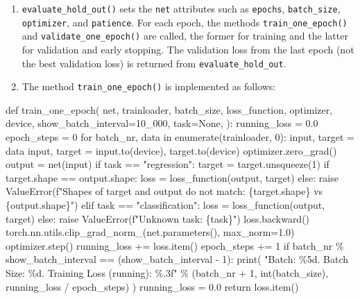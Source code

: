 \documentclass[
  letterpaper,
  DIV=11,
  numbers=noendperiod]{scrreprt}
\newenvironment{Shaded}{\begin{snugshade}}{\end{snugshade}}
\newcommand{\NormalTok}[1]{\textcolor[rgb]{0.00,0.23,0.31}{#1}}
\providecommand{\tightlist}{%
  \setlength{\itemsep}{0pt}\setlength{\parskip}{0pt}}\usepackage{longtable,booktabs,array}
\begin{document}
\begin{enumerate}
\def\labelenumi{\arabic{enumi}.}
\setcounter{enumi}{2}
\tightlist
\item
  \texttt{evaluate\_hold\_out()} sets the \texttt{net} attributes such
  as \texttt{epochs}, \texttt{batch\_size}, \texttt{optimizer}, and
  \texttt{patience}. For each epoch, the methods
  \texttt{train\_one\_epoch()} and \texttt{validate\_one\_epoch()} are
  called, the former for training and the latter for validation and
  early stopping. The validation loss from the last epoch (not the best
  validation loss) is returned from \texttt{evaluate\_hold\_out}.
\item
  The method \texttt{train\_one\_epoch()} is implemented as follows:
\end{enumerate}

\begin{Shaded}
\begin{Highlighting}[]
\NormalTok{def train\_one\_epoch(}
\NormalTok{    net,}
\NormalTok{    trainloader,}
\NormalTok{    batch\_size,}
\NormalTok{    loss\_function,}
\NormalTok{    optimizer,}
\NormalTok{    device,}
\NormalTok{    show\_batch\_interval=10\_000,}
\NormalTok{    task=None,}
\NormalTok{):}
\NormalTok{    running\_loss = 0.0}
\NormalTok{    epoch\_steps = 0}
\NormalTok{    for batch\_nr, data in enumerate(trainloader, 0):}
\NormalTok{        input, target = data}
\NormalTok{        input, target = input.to(device), target.to(device)}
\NormalTok{        optimizer.zero\_grad()}
\NormalTok{        output = net(input)}
\NormalTok{        if task == "regression":}
\NormalTok{            target = target.unsqueeze(1)}
\NormalTok{            if target.shape == output.shape:}
\NormalTok{                loss = loss\_function(output, target)}
\NormalTok{            else:}
\NormalTok{                raise ValueError(f"Shapes of target and output do not match:}
\NormalTok{                 \{target.shape\} vs \{output.shape\}")}
\NormalTok{        elif task == "classification":}
\NormalTok{            loss = loss\_function(output, target)}
\NormalTok{        else:}
\NormalTok{            raise ValueError(f"Unknown task: \{task\}")}
\NormalTok{        loss.backward()}
\NormalTok{        torch.nn.utils.clip\_grad\_norm\_(net.parameters(), max\_norm=1.0)}
\NormalTok{        optimizer.step()}
\NormalTok{        running\_loss += loss.item()}
\NormalTok{        epoch\_steps += 1}
\NormalTok{        if batch\_nr \% show\_batch\_interval == (show\_batch\_interval {-} 1):  }
\NormalTok{            print(}
\NormalTok{                "Batch: \%5d. Batch Size: \%d. Training Loss (running): \%.3f"}
\NormalTok{                \% (batch\_nr + 1, int(batch\_size), running\_loss / epoch\_steps)}
\NormalTok{            )}
\NormalTok{            running\_loss = 0.0}
\NormalTok{    return loss.item()}
\end{Highlighting}
\end{Shaded}
\end{document}
